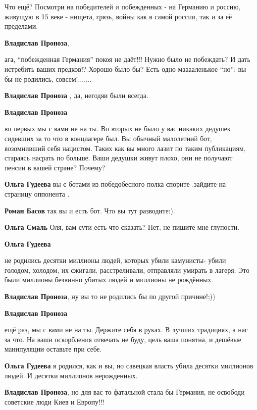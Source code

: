 \begin{itemize}
\begin{itemize}
\begin{itemize}
Что ещё? Посмотри на победителей и побежденных - на Германию и россию, живущую
в 15 веке - нищета, грязь, войны как в самой россии, так и за её пределами.

\textbf{Владислав Проноза}, 

ага, \enquote{побежденная Германия} покоя не даёт!!! Нужно было не побеждать? И дать
истребить ваших предков!? Хорошо было бы? Есть одно мааааленькое \enquote{но}: вы бы не
родились, совсем!.......


\textbf{Владислав Проноза} , да, негодяи были всегда.

\textbf{Владислав Проноза} 

во первых мы с вами не на ты. Во вторых не было у вас никаких дедушек сидевших
за то что в концлагере был. Вы обычный малолетний бот, возомнивший себя
нацистом. Таких как вы много лазит по таким публикациям, стараясь насрать по
больше. Ваши дедушки живут плохо, они не получают пенсии в вашей стране?
Почему?

\textbf{Ольга Гудеева} вы с ботами из победобесного полка спорите .зайдите на страницу оппонента .

\textbf{Роман Басов} так вы и есть бот. Что вы тут разводите:).

\textbf{Ольга Смаль} Оля, вам сути есть что сказать? Нет, не пишите мне глупости.

\textbf{Ольга Гудеева} 

не родились десятки миллионы людей, которых убили камунисты- убили
голодом, холодом, их сжигали, расстреливали, отправляли умирать в лагеря. Это были
миллионы безвинно убитых людей и миллионы не рождённых.


\textbf{Владислав Проноза}, ну вы то не родились бы по другой причине!;))

\textbf{Владислав Проноза} 

ещё раз, мы с вами не на ты. Держите себя в руках. В лучших традициях, а нас за
что. На ваши оскорбления отвечать не буду, цель ваша понятна, и дешёвые
манипуляции оставьте при себе.


\textbf{Ольга Гудеева} я родился, как и вы, но савецкая власть убила десятки миллионов людей. И десятки миллионов нерожденных.

\textbf{Владислав Проноза}, но для вас то фатальной стала бы Германия, не освободи советские люди Киев и Европу!!!


\end{itemize}
\end{itemize}
\end{itemize}
